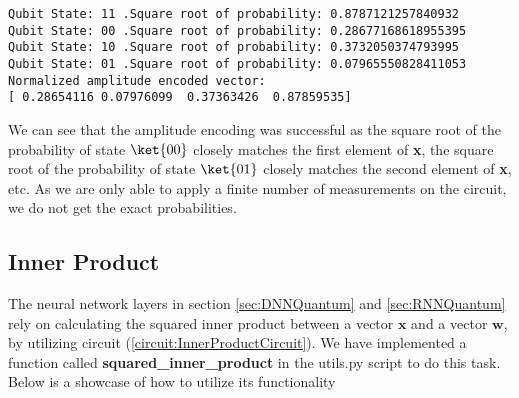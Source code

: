 \begin{verbatim}
Qubit State: 11 .Square root of probability: 0.8787121257840932
Qubit State: 00 .Square root of probability: 0.28677168618955395
Qubit State: 10 .Square root of probability: 0.3732050374793995
Qubit State: 01 .Square root of probability: 0.07965550828411053
Normalized amplitude encoded vector:  
[ 0.28654116 0.07976099  0.37363426  0.87859535]
\end{verbatim}
We can see that the amplitude encoding was successful as the square root of the probability of state $\ket{00}$ closely matches the first element of \textbf{x}, the square root of the probability of state $\ket{01}$ closely matches the second element of \textbf{x}, etc. As we are only able to apply a finite number of measurements on the circuit, we do not get the exact probabilities.

\subsection{Inner Product}
\label{subsec:MethodsInnerProduct}

The neural network layers in section \ref{sec:DNNQuantum} and \ref{sec:RNNQuantum} rely on calculating the squared inner product between a vector $\boldsymbol{x}$ and a vector $\boldsymbol{w}$, by utilizing circuit (\ref{circuit:InnerProductCircuit}). We have implemented a function called \textbf{squared\_inner\_product} in the utils.py script to do this task. Below is a showcase of how to utilize its functionality

